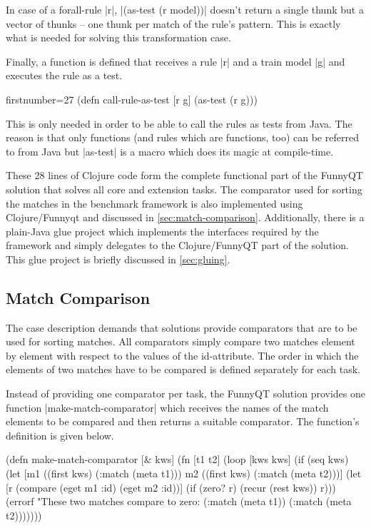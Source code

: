 \documentclass[submission]{eptcs}
\newcommand{\code}{\clojureinline}
\begin{document}
In case of a forall-rule \code|r|, \code|(as-test (r model))| doesn't return a
single thunk but a vector of thunks -- one thunk per match of the rule's
pattern.  This is exactly what is needed for solving this transformation case.

Finally, a function is defined that receives a rule \code|r| and a train model
\code|g| and executes the rule as a test.

\begin{clojurecode*}{firstnumber=27}
(defn call-rule-as-test [r g]
  (as-test (r g)))
\end{clojurecode*}

This is only needed in order to be able to call the rules as tests from Java.
The reason is that only functions (and rules which are functions, too) can be
referred to from Java but \code|as-test| is a macro which does its magic at
compile-time.

These 28 lines of Clojure code form the complete functional part of the FunnyQT
solution that solves all core and extension tasks.  The comparator used for
sorting the matches in the benchmark framework is also implemented using
Clojure/Funnyqt and discussed in \vref{sec:match-comparison}.  Additionally,
there is a plain-Java glue project which implements the interfaces required by
the framework and simply delegates to the Clojure/FunnyQT part of the solution.
This glue project is briefly discussed in \vref{sec:gluing}.


\subsection{Match Comparison}
\label{sec:match-comparison}

The case description demands that solutions provide comparators that are to be
used for sorting matches.  All comparators simply compare two matches element
by element with respect to the values of the \textsf{id}-attribute.  The order
in which the elements of two matches have to be compared is defined separately
for each task.

Instead of providing one comparator per task, the FunnyQT solution provides one
function \code|make-match-comparator| which receives the names of the match
elements to be compared and then returns a suitable comparator.  The function's
definition is given below.

\begin{clojurecode}
(defn make-match-comparator [& kws]
  (fn [t1 t2]
    (loop [kws kws]
      (if (seq kws)
        (let [m1 ((first kws) (:match (meta t1)))
              m2 ((first kws) (:match (meta t2)))]
          (let [r (compare (eget m1 :id) (eget m2 :id))]
            (if (zero? r)
              (recur (rest kws))
              r)))
        (errorf "These two matches compare to zero: %
                (:match (meta t1))
                (:match (meta t2)))))))
\end{clojurecode}
\end{document}
